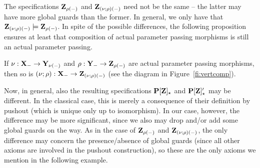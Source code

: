 The specifications ${\bf Z_{\rho(-)}}$ and
${\bf Z_{(\nu;\rho)(-)}}$ need not be the same -- the latter may have
more global guards than the former. In general, we only have that 
${\bf Z_{(\nu;\rho)(-)}}\models {\bf Z_{\rho(-)}}$.
In spite of the possible differences, the following proposition ensures at
least that
composition of actual parameter passing morphisms is still an actual parameter passing.
\begin{proposition}\label{prop:vertcomp}
If 
$\nu:{\bf X}_-\to {\bf Y}_{\nu(-)}$ and $\rho:{\bf Y}_-\to {\bf Z}_{\rho(-)}$
 are actual parameter passing
morphisms, then so is $(\nu;\rho):{\bf X}_- \to {\bf Z}_{(\nu;\rho)(-)}$
(see the diagram in Figure~\ref{fi:vertcomp}). 
\end{proposition}
%
Now, in general, also the resulting specifications ${\bf P[Z]_\star}$ and
${\bf P[Z]'_\star}$ may be different. In the classical case, this is merely a
consequence of their definition by pushout (which is unique only up to
isomorphism). In our case, however, the difference may be more significant,
since we also may drop and/or add some global guards on the way. 
As in the case of ${\bf Z_{\rho(-)}}$ and ${\bf Z_{(\nu;\rho)(-)}}$, 
the only difference may concern the presence/absence of global guards (since
all other axioms are involved in the pushout construction), so these are the only
axioms we mention in the following example.
